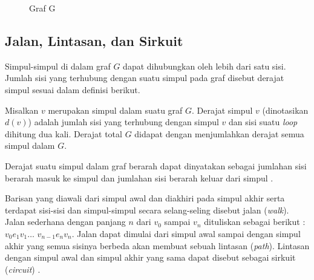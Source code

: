 {{        \begin{figure}
            \centering
            \vspace{-7mm}
            \caption{Graf G}
            \label{gam:Graf G}
        \end{figure}
    }

    \vspace{-5mm}
    \subsection{Jalan, Lintasan, dan Sirkuit}
    {\frenchspacing
        Simpul-simpul di dalam graf $G$ dapat dihubungkan oleh lebih dari satu sisi.
        Jumlah sisi yang terhubung dengan suatu simpul pada graf disebut derajat simpul sesuai dalam definisi berikut.
        \begin{definisi}
            \label{def:Derajat Graf}
            Misalkan $v$ merupakan simpul dalam suatu graf $G$.
            Derajat simpul $v$ (dinotasikan $d(v)$) adalah jumlah sisi yang terhubung dengan simpul $v$
            dan sisi suatu \textit{loop} dihitung dua kali.
            Derajat total $G$ didapat dengan menjumlahkan derajat semua simpul dalam $G$.
        \end{definisi}
        \noindent
        Derajat suatu simpul dalam graf berarah dapat dinyatakan sebagai jumlahan sisi berarah masuk ke simpul dan jumlahan sisi
        berarah keluar dari simpul .

        Barisan yang diawali dari simpul awal dan diakhiri pada simpul akhir serta
        terdapat sisi-sisi dan simpul-simpul secara selang-seling disebut jalan (\textit{walk}).
        Jalan sederhana dengan panjang $n$ dari $v_{0}$ sampai $v_{n}$ dituliskan sebagai berikut :
        $v_{0} e_{1} v_{1} \dots $ $v_{n-1} e_{n} v_{n}$.
        Jalan dapat dimulai dari simpul awal sampai dengan simpul akhir yang semua sisinya berbeda akan membuat sebuah lintasan (\textit{path}).
        Lintasan dengan simpul awal dan simpul akhir yang sama dapat disebut sebagai sirkuit (\textit{circuit}) .
    }

}
